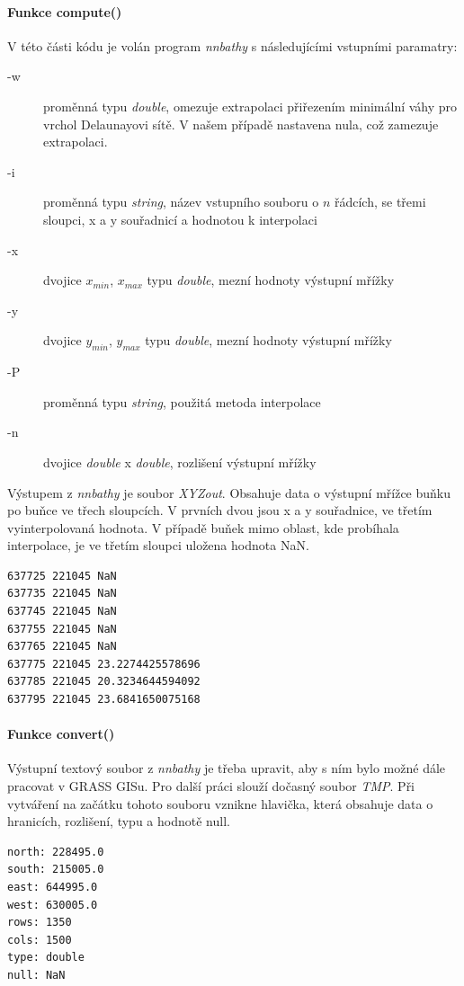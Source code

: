 \documentclass[12pt,a4paper]{article}
\begin{document}
\bigskip
\paragraph{Funkce compute()}
V této části kódu je volán program \emph{nnbathy} s následujícími vstupními paramatry:
\begin{description}
\item[-w]{proměnná typu \emph{double}, omezuje extrapolaci přiřezením minimální váhy pro vrchol Delaunayovi sítě. V našem případě nastavena nula, což zamezuje extrapolaci.}
\item[-i]{proměnná typu \emph{string}, název vstupního souboru o $n$ řádcích, se třemi sloupci, x a y souřadnicí a hodnotou k interpolaci}
\item[-x]{dvojice $x_{min}$, $x_{max}$ typu \emph{double}, mezní hodnoty výstupní mřížky}
\item[-y]{dvojice $y_{min}$, $y_{max}$ typu \emph{double}, mezní hodnoty výstupní mřížky}
\item[-P]{proměnná typu \emph{string}, použitá metoda interpolace}
\item[-n]{dvojice \emph{double} x \emph{double}, rozlišení výstupní mřížky}
\end{description}

Výstupem z \emph{nnbathy} je soubor \emph{XYZout}. Obsahuje data o výstupní mřížce buňku po buňce ve třech sloupcích. V prvních dvou jsou x a y souřadnice, ve třetím vyinterpolovaná hodnota. V případě buňek mimo oblast, kde probíhala interpolace, je ve třetím sloupci uložena hodnota NaN.

\bigskip
\lstset{basicstyle=\footnotesize}
\begin{lstlisting}[caption={XYZout}]
637725 221045 NaN
637735 221045 NaN
637745 221045 NaN
637755 221045 NaN
637765 221045 NaN
637775 221045 23.2274425578696
637785 221045 20.3234644594092
637795 221045 23.6841650075168
\end{lstlisting}

\bigskip
\paragraph{Funkce convert()}
Výstupní textový soubor z \emph{nnbathy} je třeba upravit, aby s ním bylo možné dále pracovat v GRASS GISu. Pro další práci slouží dočasný soubor \emph{TMP}. Při vytváření na začátku tohoto souboru vznikne hlavička, která obsahuje data o hranicích, rozlišení, typu a hodnotě null.

\newpage
\lstset{basicstyle=\ttfamily}
\begin{lstlisting}[caption={Hlavička souboru TMP}]
north: 228495.0
south: 215005.0
east: 644995.0
west: 630005.0
rows: 1350
cols: 1500
type: double
null: NaN
\end{lstlisting}
\end{document}
